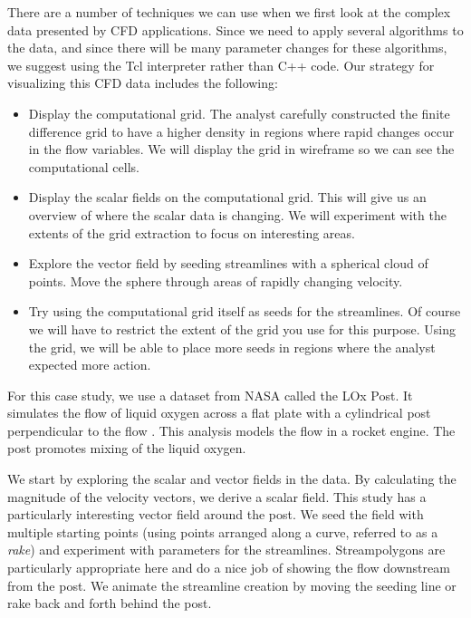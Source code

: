 There are a number of techniques we can use when we first look at the complex data presented by CFD applications.
Since we need to apply several algorithms to the data, and since there will be many parameter changes for these algorithms, we suggest using the Tcl interpreter rather than C++ code.
Our strategy for visualizing this CFD data includes the following:

\begin{itemize}

    \item Display the computational grid. The analyst carefully constructed the finite difference grid to have a higher density in regions where rapid changes occur in the flow variables. We will display the grid in wireframe so we can see the computational cells.

    \item Display the scalar fields on the computational grid. This will give us an overview of where the scalar data is changing. We will experiment with the extents of the grid extraction to focus on interesting areas.

    \item Explore the vector field by seeding streamlines with a spherical cloud of points. Move the sphere through areas of rapidly changing velocity.

    \item Try using the computational grid itself as seeds for the streamlines. Of course we will have to restrict the extent of the grid you use for this purpose. Using the grid, we will be able to place more seeds in regions where the analyst expected more action.

\end{itemize}

For this case study, we use a dataset from NASA called the LOx Post.
It simulates the flow of liquid oxygen across a flat plate with a cylindrical post perpendicular to the flow \cite{Rogers86}.
This analysis models the flow in a rocket engine.
The post promotes mixing of the liquid oxygen.

We start by exploring the scalar and vector fields in the data. By calculating the magnitude of the velocity vectors, we derive a scalar field.
This study has a particularly interesting vector field around the post.
We seed the field with multiple starting points (using points arranged along a curve, referred to as a \emph{rake}) and experiment with parameters for the streamlines.
Streampolygons are particularly appropriate here and do a nice job of showing the flow downstream from the post.
We animate the streamline creation by moving the seeding line or rake back and forth behind the post.

